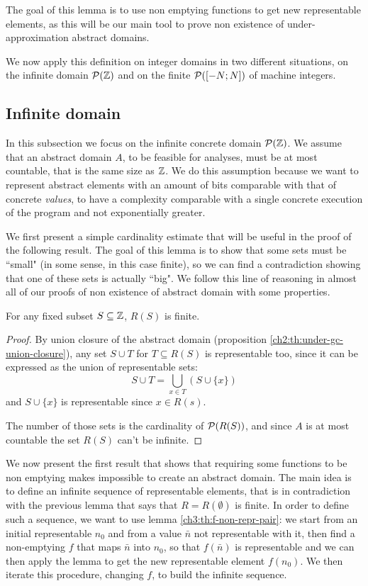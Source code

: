 The goal of this lemma is to use non emptying functions to get new representable elements, as this will be our main tool to prove non existence of under-approximation abstract domains.

We now apply this definition on integer domains in two different situations, on the infinite domain $\mathcal{P}(\mathbb{Z})$ and on the finite $\mathcal{P}([-N; N])$ of machine integers.

\subsection{Infinite domain}
In this subsection we focus on the infinite concrete domain $\mathcal{P}(\mathbb{Z})$. We assume that an abstract domain $A$, to be feasible for analyses, must be at most countable, that is the same size as $\mathbb{Z}$. We do this assumption because we want to represent abstract elements with an amount of bits comparable with that of concrete \textit{values}, to have a complexity comparable with a single concrete execution of the program and not exponentially greater.

We first present a simple cardinality estimate that will be useful in the proof of the following result. The goal of this lemma is to show that some sets must be ``small" (in some sense, in this case finite), so we can find a contradiction showing that one of these sets is actually ``big". We follow this line of reasoning in almost all of our proofs of non existence of abstract domain with some properties.

\begin{lemma}\label{ch3:th:R-S-bound-integer-inf}
	For any fixed subset $S \subseteq \mathbb{Z}$, $R(S)$ is finite.
\end{lemma}
\begin{proof}
	By union closure of the abstract domain (proposition \ref{ch2:th:under-gc-union-closure}), any set $S \cup T$ for $T \subseteq R(S)$ is representable too, since it can be expressed as the union of representable sets:
	\[
	S \cup T = \bigcup\limits_{x \in T} (S \cup \{ x \})
	\]
	and $S \cup \{ x \}$ is representable since $x \in R(s)$.

	The number of those sets is the cardinality of $\mathcal{P}(R(S))$, and since $A$ is at most countable the set $R(S)$ can't be infinite.
\end{proof}

We now present the first result that shows that requiring some functions to be non emptying makes impossible to create an abstract domain. The main idea is to define an infinite sequence of representable elements, that is in contradiction with the previous lemma that says that $R = R(\emptyset)$ is finite.
In order to define such a sequence, we want to use lemma \ref{ch3:th:f-non-repr-pair}: we start from an initial representable $n_0$ and from a value $\bar{n}$ not representable with it, then find a non-emptying $f$ that maps $\bar{n}$ into $n_0$, so that $f(\bar{n})$ is representable and we can then apply the lemma to get the new representable element $f(n_0)$. We then iterate this procedure, changing $f$, to build the infinite sequence.

